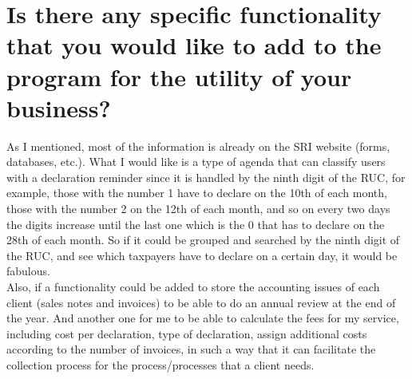 \documentclass[a4paper]{article}
\begin{document}
\section{Is there any specific functionality that you would like to add to the program for the utility of your business?}
As I mentioned, most of the information is already on the SRI website (forms, databases, etc.). What I would like is a type of agenda that can classify users with a declaration reminder since it is handled by the ninth digit of the RUC, for example, those with the number 1 have to declare on the 10th of each month, those with the number 2 on the 12th of each month, and so on every two days the digits increase until the last one which is the 0 that has to declare on the 28th of each month. So if it could be grouped and searched by the ninth digit of the RUC, and see which taxpayers have to declare on a certain day, it would be fabulous.\\
Also, if a functionality could be added to store the accounting issues of each client (sales notes and invoices) to be able to do an annual review at the end of the year. And another one for me to be able to calculate the fees for my service, including cost per declaration, type of declaration, assign additional costs according to the number of invoices, in such a way that it can facilitate the collection process for the process/processes that a client needs.
\end{document}
